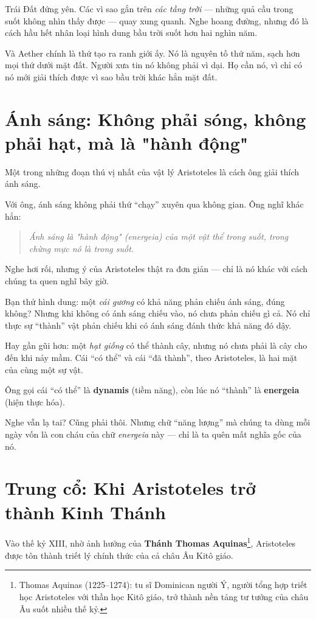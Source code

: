 Trái Đất đứng yên. Các vì sao gắn trên \emph{các tầng trời} — những quả cầu trong suốt không nhìn thấy được — quay xung quanh. Nghe hoang đường, nhưng đó là cách hầu hết nhân loại hình dung bầu trời suốt hơn hai nghìn năm.

Và Aether chính là thứ tạo ra ranh giới ấy. Nó là nguyên tố thứ năm, sạch hơn mọi thứ dưới mặt đất. Người xưa tin nó không phải vì dại. Họ cần nó, vì chỉ có nó mới giải thích được vì sao bầu trời khác hẳn mặt đất.


\section{Ánh sáng: Không phải sóng, không phải hạt, mà là "hành động"}

Một trong những đoạn thú vị nhất của vật lý Aristoteles là cách ông giải thích ánh sáng.

Với ông, ánh sáng không phải thứ “chạy” xuyên qua không gian. Ông nghĩ khác hẳn:

\begin{quote}
\emph{Ánh sáng là "hành động" (energeia) của một vật thể trong suốt, trong chừng mực nó là trong suốt.}
\end{quote}

Nghe hơi rối, nhưng ý của Aristoteles thật ra đơn giản — chỉ là nó khác với cách chúng ta quen nghĩ bây giờ.

Bạn thử hình dung: một \emph{cái gương} có khả năng phản chiếu ánh sáng, đúng không? Nhưng khi không có ánh sáng chiếu vào, nó chưa phản chiếu gì cả. Nó chỉ thực sự “thành” vật phản chiếu khi có ánh sáng đánh thức khả năng đó dậy.

Hay gần gũi hơn: một \emph{hạt giống} có thể thành cây, nhưng nó chưa phải là cây cho đến khi nảy mầm. Cái “có thể” và cái “đã thành”, theo Aristoteles, là hai mặt của cùng một sự vật.

Ông gọi cái “có thể” là \textbf{dynamis} (tiềm năng), còn lúc nó “thành” là \textbf{energeia} (hiện thực hóa).

Nghe vẫn lạ tai? Cũng phải thôi. Nhưng chữ “năng lượng” mà chúng ta dùng mỗi ngày vốn là con cháu của chữ \emph{energeia} này — chỉ là ta quên mất nghĩa gốc của nó.


\section{Trung cổ: Khi Aristoteles trở thành Kinh Thánh}

Vào thế kỷ XIII, nhờ ảnh hưởng của \textbf{Thánh Thomas Aquinas}\footnote{Thomas Aquinas (1225--1274): tu sĩ Dominican người Ý, người tổng hợp triết học Aristoteles với thần học Kitô giáo, trở thành nền tảng tư tưởng của châu Âu suốt nhiều thế kỷ.}, Aristoteles được tôn thành triết lý chính thức của cả châu Âu Kitô giáo.


